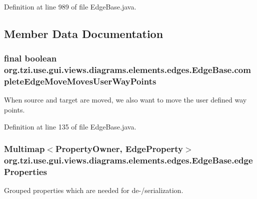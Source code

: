 Definition at line 989 of file Edge\-Base.\-java.



\subsection{Member Data Documentation}
\hypertarget{classorg_1_1tzi_1_1use_1_1gui_1_1views_1_1diagrams_1_1elements_1_1edges_1_1_edge_base_ad97a3ce3074b08b65550e796d09f8e42}{
\subsubsection[{complete\-Edge\-Move\-Moves\-User\-Way\-Points}]{\setlength{\rightskip}{0pt plus 5cm}final boolean org.\-tzi.\-use.\-gui.\-views.\-diagrams.\-elements.\-edges.\-Edge\-Base.\-complete\-Edge\-Move\-Moves\-User\-Way\-Points\hspace{0.3cm}{\ttfamily [protected]}}}\label{classorg_1_1tzi_1_1use_1_1gui_1_1views_1_1diagrams_1_1elements_1_1edges_1_1_edge_base_ad97a3ce3074b08b65550e796d09f8e42}
When source and target are moved, we also want to move the user defined way points. 

Definition at line 135 of file Edge\-Base.\-java.

\hypertarget{classorg_1_1tzi_1_1use_1_1gui_1_1views_1_1diagrams_1_1elements_1_1edges_1_1_edge_base_a082ce55076391f012a5f111d7a3c2759}{
\subsubsection[{edge\-Properties}]{\setlength{\rightskip}{0pt plus 5cm}Multimap$<${\bf Property\-Owner}, {\bf Edge\-Property}$>$ org.\-tzi.\-use.\-gui.\-views.\-diagrams.\-elements.\-edges.\-Edge\-Base.\-edge\-Properties\hspace{0.3cm}{\ttfamily [protected]}}}\label{classorg_1_1tzi_1_1use_1_1gui_1_1views_1_1diagrams_1_1elements_1_1edges_1_1_edge_base_a082ce55076391f012a5f111d7a3c2759}
Grouped properties which are needed for de-\//serialization. 

